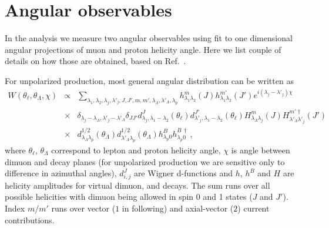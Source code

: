 \section{Angular observables}
\label{ap:angObservables}

In the analysis we measure two angular observables using fit to one dimensional angular projections
of muon and proton helicity angle. Here we list couple of details on how those are obtained, based
on Ref.~\cite{Gutsche:2013pp}. 

For unpolarized production, most general angular distribution can be written as 
\begin{eqnarray}
\label{bjoint3}
W(\theta_\ell,\theta_\Lambda,\chi)  &\propto& 
\sum_{\lambda_1,\lambda_{2},\lambda_j,\lambda'_j,J,J',m,m',\lambda_{\Lambda},
\lambda'_{\Lambda},\lambda_{p}} 
h^{m}_{\lambda_1\lambda_2}(J)h^{m'}_{\lambda_1\lambda_2}(J')
e^{i(\lambda_{j}-\lambda'_{j})\chi}
\nonumber\\ 
&\times&
\delta_{\lambda_{j}-\lambda_{\Lambda},\lambda'_{j}-\lambda'_{\Lambda}}
\delta_{JJ'}
d^J_{\lambda_j,\lambda_1-\lambda_{2}}(\theta_\ell)
d^{J'}_{\lambda'_j,\lambda_1-\lambda_{2}}(\theta_\ell)
H^{m}_{\lambda_{\Lambda}\lambda_{j}}(J)
H^{m'\dagger}_{\lambda'_{\Lambda}\lambda'_{j}}(J')
\nonumber \\
&\times& 
d^{1/2}_{\lambda_{\Lambda}\lambda_{p}}(\theta_\Lambda)
d^{1/2}_{\lambda'_{\Lambda}\lambda_{p}}(\theta_\Lambda)
h^{B}_{\lambda_{p}0}h^{B\,\dagger}_{\lambda_{p}0}\,,
\end{eqnarray}
where $\theta_\ell$, $\theta_\Lambda$ correspond to lepton and proton helicity angle, $\chi$ is angle between
dimuon and \Lz decay planes (for unpolarized production we are sensitive only to difference in
azimuthal angles), $d^J_{i,j}$ are Wigner d-functions and $h$, $h^B$ and $H$ are helicity amplitudes
for virtual dimuon, \Lz and \Lb decays. The sum runs over all possible helicities with dimuon being
allowed in spin 0 and 1 states ($J$ and $J'$). Index $m$/$m'$ runs over vector ($1$ in following)
and axial-vector ($2$) current contributions.

